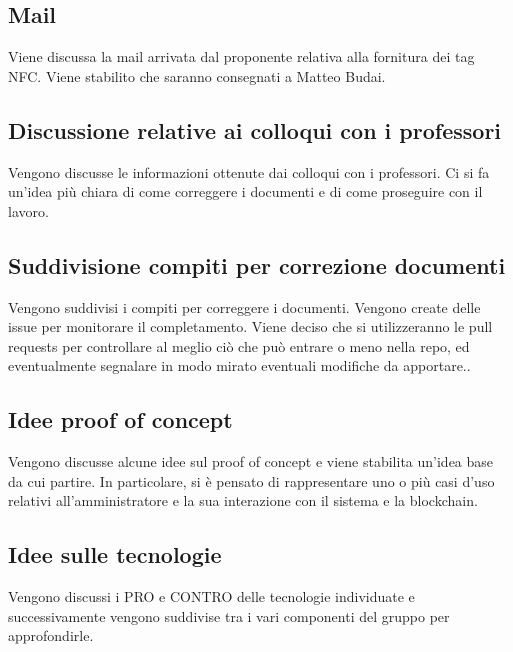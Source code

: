 \subsection*{Mail}
Viene discussa la mail arrivata dal proponente relativa alla fornitura dei tag NFC. Viene stabilito che saranno consegnati a Matteo Budai.
\subsection*{Discussione relative ai colloqui con i professori}
Vengono discusse le informazioni ottenute dai colloqui con i professori. Ci si fa un'idea più chiara di come correggere i documenti e di come proseguire con il lavoro.
\subsection*{Suddivisione compiti per correzione documenti}
Vengono suddivisi i compiti per correggere i documenti. Vengono create delle issue per monitorare il completamento. Viene deciso che si utilizzeranno le pull requests per controllare al meglio ciò che può entrare o meno nella repo, ed eventualmente segnalare in modo mirato eventuali modifiche da apportare..
\subsection*{Idee proof of concept}
Vengono discusse alcune idee sul proof of concept e viene stabilita un'idea base da cui partire.
In particolare, si è pensato di rappresentare uno o più casi d'uso relativi all'amministratore e la sua interazione con il sistema e la blockchain.
\subsection*{Idee sulle tecnologie}
Vengono discussi i PRO e CONTRO delle tecnologie individuate e successivamente vengono suddivise tra i vari componenti del gruppo per approfondirle.

